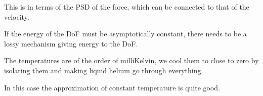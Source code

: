 \documentclass[main.tex]{subfiles}
\begin{document}
This is in terms of the PSD of the force, which can be connected to that of the velocity.

If the energy of the DoF must be asymptotically constant, there needs to be a lossy mechanism giving energy to the DoF. 


The temperatures are of the order of milliKelvin, we cool them to close to zero by isolating them and making liquid helium go through everything. 

In this case the approximation of constant temperature is quite good.
\end{document}
